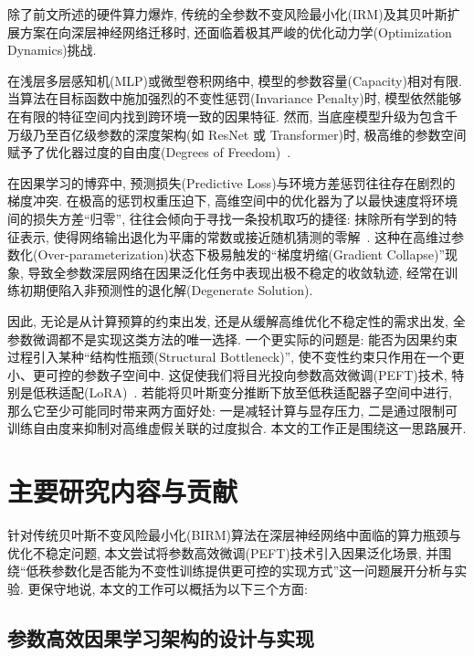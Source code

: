 \documentclass[a4paper,punct=banjiao,twoside]{ctexrep}
\theoremstyle{plain}
\theoremstyle{definition}
\theoremstyle{remark}
\begin{document}
除了前文所述的硬件算力爆炸, 传统的全参数不变风险最小化(IRM)及其贝叶斯扩展方案在向深层神经网络迁移时, 还面临着极其严峻的优化动力学(Optimization Dynamics)挑战. 

在浅层多层感知机(MLP)或微型卷积网络中, 模型的参数容量(Capacity)相对有限. 当算法在目标函数中施加强烈的不变性惩罚(Invariance Penalty)时, 模型依然能够在有限的特征空间内找到跨环境一致的因果特征. 然而, 当底座模型升级为包含千万级乃至百亿级参数的深度架构(如 ResNet 或 Transformer)时, 极高维的参数空间赋予了优化器过度的自由度(Degrees of Freedom)~\cite{lin2022bayesian}. 

在因果学习的博弈中, 预测损失(Predictive Loss)与环境方差惩罚往往存在剧烈的梯度冲突. 在极高的惩罚权重压迫下, 高维空间中的优化器为了以最快速度将环境间的损失方差“归零”, 往往会倾向于寻找一条投机取巧的捷径: 抹除所有学到的特征表示, 使得网络输出退化为平庸的常数或接近随机猜测的零解~\cite{geirhos2020shortcut}. 这种在高维过参数化(Over-parameterization)状态下极易触发的“梯度坍缩(Gradient Collapse)”现象, 导致全参数深层网络在因果泛化任务中表现出极不稳定的收敛轨迹, 经常在训练初期便陷入非预测性的退化解(Degenerate Solution). 

因此, 无论是从计算预算的约束出发, 还是从缓解高维优化不稳定性的需求出发, 全参数微调都不是实现这类方法的唯一选择. 一个更实际的问题是: 能否为因果约束过程引入某种“结构性瓶颈(Structural Bottleneck)”, 使不变性约束只作用在一个更小、更可控的参数子空间中. 这促使我们将目光投向参数高效微调(PEFT)技术, 特别是低秩适配(LoRA)~\cite{hu2021lora}. 若能将贝叶斯变分推断下放至低秩适配器子空间中进行, 那么它至少可能同时带来两方面好处: 一是减轻计算与显存压力, 二是通过限制可训练自由度来抑制对高维虚假关联的过度拟合. 本文的工作正是围绕这一思路展开.

\section{主要研究内容与贡献}

针对传统贝叶斯不变风险最小化(BIRM)算法在深层神经网络中面临的算力瓶颈与优化不稳定问题, 本文尝试将参数高效微调(PEFT)技术引入因果泛化场景, 并围绕“低秩参数化是否能为不变性训练提供更可控的实现方式”这一问题展开分析与实验. 更保守地说, 本文的工作可以概括为以下三个方面:

\subsection{参数高效因果学习架构的设计与实现}
\end{document}
